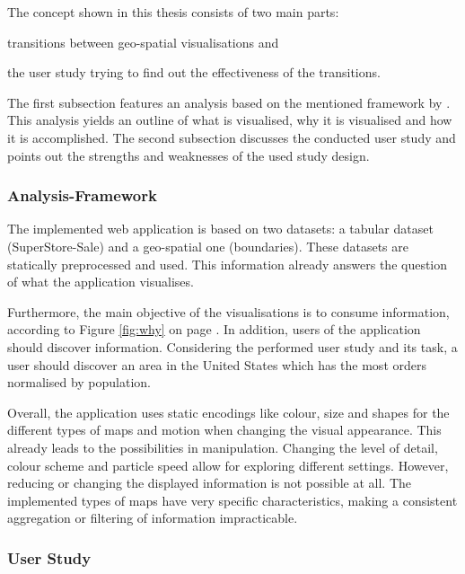 The concept shown in this thesis consists of two main parts:
\begin{enumerate*}[label={(\arabic*)}]
\item transitions between geo-spatial visualisations and
\item the user study trying to find out the effectiveness of the transitions.
\end{enumerate*}

The first subsection features an analysis based on the mentioned framework by \citeauthor{Munzner2014}. This analysis yields an outline of what is visualised, why it is visualised and how it is accomplished. The second subsection discusses the conducted user study and points out the strengths and weaknesses of the used study design.

\subsubsection{Analysis-Framework}
The implemented web application is based on two datasets: a tabular dataset (SuperStore-Sale) and a geo-spatial one (boundaries). These datasets are statically preprocessed and used. This information already answers the question of what the application visualises.

Furthermore, the main objective of the visualisations is to consume information, according to Figure \ref{fig:why} on page \pageref{fig:why}. In addition, users of the application should discover information. Considering the performed user study and its task, a user should discover an area in the United States which has the most orders normalised by population.

Overall, the application uses static encodings like colour, size and shapes for the different types of maps and motion when changing the visual appearance. This already leads to the possibilities in manipulation. Changing the level of detail, colour scheme and particle speed allow for exploring different settings. However, reducing or changing the displayed information is not possible at all. The implemented types of maps have very specific characteristics, making a consistent aggregation or filtering of information impracticable.

\newpage
\subsubsection{User Study}
\label{s:discussion-study}
